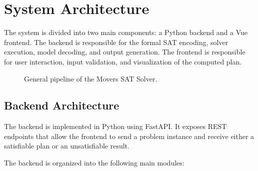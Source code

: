 \section{System Architecture} \label{sec:system-architecture}
The system is divided into two main components: a Python backend and a Vue frontend.
The backend is responsible for the formal SAT encoding, solver execution, model decoding, and output generation.
The frontend is responsible for user interaction, input validation, and visualization of the computed plan.

\begin{figure}[H]
    \centering
    \caption{General pipeline of the Movers SAT Solver.}
    \label{fig:pipeline}
\end{figure}

\subsection{Backend Architecture} \label{subsec:backend-architecture}

The backend is implemented in Python using FastAPI\@.
It exposes REST endpoints that allow the frontend to send a problem instance and receive either a satisfiable plan or an unsatisfiable result.

\noindent The backend is organized into the following main modules:

